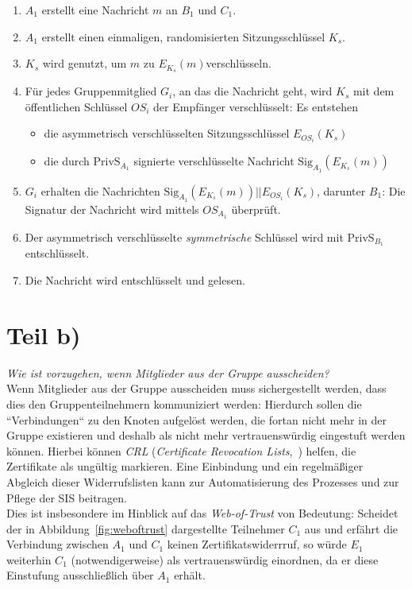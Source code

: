 \begin{enumerate}
    \itemsep0.5em
    \item $A_1$ erstellt eine Nachricht $m$ an $B_1$ und $C_1$.
    \item $A_1$ erstellt einen einmaligen, randomisierten Sitzungsschlüssel $K_s$.
    \item $K_s$ wird genutzt, um $m$ zu $E_{K_s}(m)$verschlüsseln.
    \item Für jedes Gruppenmitglied $G_i$, an das die Nachricht geht, wird $K_s$ mit dem öffentlichen Schlüssel $OS_i$ der Empfänger verschlüsselt: Es entstehen
    \begin{itemize}
        \item die asymmetrisch verschlüsselten Sitzungsschlüssel $E_{OS_i}(K_s)$
        \item die durch $\text{PrivS}_{A_1}$ signierte verschlüsselte Nachricht $\text{Sig}_{A_1}(E_{K_s}(m))$
    \end{itemize}
    \item $G_i$ erhalten die Nachrichten $\text{Sig}_{A_1}(E_{K_s}(m))||E_{OS_i}(K_s)$, darunter $B_1$: Die Signatur der Nachricht wird mittels $OS_{A_1}$ überprüft.
    \item Der asymmetrisch verschlüsselte \textit{symmetrische} Schlüssel wird mit $\text{PrivS}_{B_1}$ entschlüsselt.
    \item Die Nachricht wird entschlüsselt und gelesen.
\end{enumerate}

\section{Teil b)}

\textit{Wie ist vorzugehen, wenn Mitglieder aus der Gruppe ausscheiden?}\\

\noindent
Wenn Mitglieder aus der Gruppe ausscheiden muss sichergestellt werden, dass dies den Gruppenteilnehmern kommuniziert werden: Hierdurch sollen die ``Verbindungen`` zu den Knoten aufgelöst werden, die fortan nicht mehr in der Gruppe existieren und deshalb als nicht mehr vertrauenswürdig eingestuft werden können.
Hierbei können \textit{CRL} (\textit{Certificate Revocation Lists},~\cite[34 f.]{ITS6}) helfen, die Zertifikate als ungültig markieren.
Eine Einbindung und ein regelmäßiger Abgleich dieser Widerrufslisten kann zur Automatisierung des Prozesses und zur Pflege der SIS beitragen.\\
Dies ist insbesondere im Hinblick auf das \textit{Web-of-Trust} von Bedeutung: Scheidet der in Abbildung~\ref{fig:weboftrust} dargestellte Teilnehmer $C_1$ aus und erfährt die Verbindung zwischen $A_1$ und $C_1$ keinen Zertifikatswiderrruf, so würde $E_1$ weiterhin $C_1$ (notwendigerweise) als vertrauenswürdig einordnen, da er diese Einstufung ausschließlich über $A_1$ erhält.